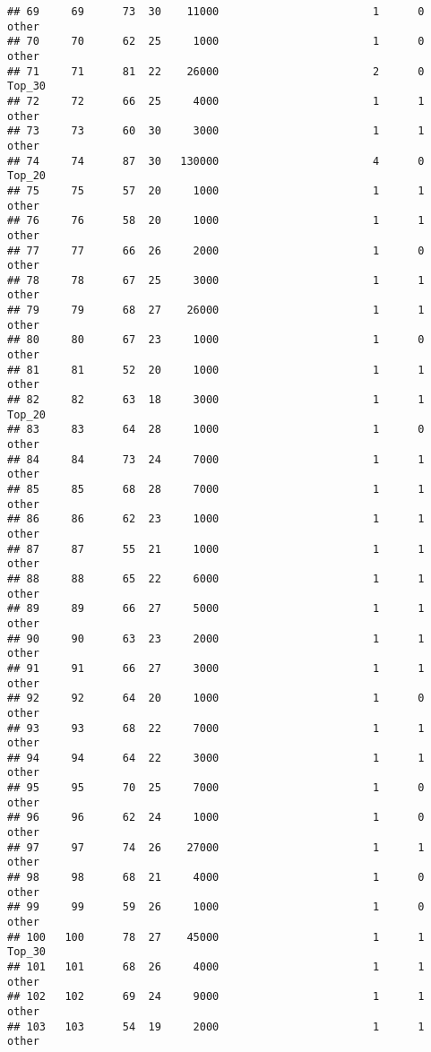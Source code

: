 \documentclass[
]{article}
\begin{document}
\begin{verbatim}
## 69     69      73  30    11000                        1      0    other
## 70     70      62  25     1000                        1      0    other
## 71     71      81  22    26000                        2      0   Top_30
## 72     72      66  25     4000                        1      1    other
## 73     73      60  30     3000                        1      1    other
## 74     74      87  30   130000                        4      0   Top_20
## 75     75      57  20     1000                        1      1    other
## 76     76      58  20     1000                        1      1    other
## 77     77      66  26     2000                        1      0    other
## 78     78      67  25     3000                        1      1    other
## 79     79      68  27    26000                        1      1    other
## 80     80      67  23     1000                        1      0    other
## 81     81      52  20     1000                        1      1    other
## 82     82      63  18     3000                        1      1   Top_20
## 83     83      64  28     1000                        1      0    other
## 84     84      73  24     7000                        1      1    other
## 85     85      68  28     7000                        1      1    other
## 86     86      62  23     1000                        1      1    other
## 87     87      55  21     1000                        1      1    other
## 88     88      65  22     6000                        1      1    other
## 89     89      66  27     5000                        1      1    other
## 90     90      63  23     2000                        1      1    other
## 91     91      66  27     3000                        1      1    other
## 92     92      64  20     1000                        1      0    other
## 93     93      68  22     7000                        1      1    other
## 94     94      64  22     3000                        1      1    other
## 95     95      70  25     7000                        1      0    other
## 96     96      62  24     1000                        1      0    other
## 97     97      74  26    27000                        1      1    other
## 98     98      68  21     4000                        1      0    other
## 99     99      59  26     1000                        1      0    other
## 100   100      78  27    45000                        1      1   Top_30
## 101   101      68  26     4000                        1      1    other
## 102   102      69  24     9000                        1      1    other
## 103   103      54  19     2000                        1      1    other

\end{verbatim}
\end{document}
